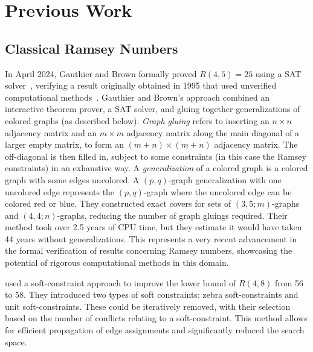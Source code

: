 \section{Previous Work}
\subsection{Classical Ramsey Numbers}

In April 2024, Gauthier and Brown formally proved $R(4, 5) = 25$ using a SAT solver~\cite{r45_formal}, verifying a result originally obtained in 1995 that used unverified computational methods~\cite{r_45_mckay}.
Gauthier and Brown's approach combined an interactive theorem prover, a SAT solver, and gluing together generalizations of colored graphs (as described below).
\emph{Graph gluing} refers to inserting an $n \times n$ adjacency matrix and an $m \times m$ adjacency matrix along the main diagonal of a larger empty matrix, to form an $(m+n) \times (m+n)$ adjacency matrix. 
The off-diagonal is then filled in, subject to some constraints (in this case the Ramsey constraints) in an exhaustive way.
A \emph{generalization} of a colored graph is a colored graph with some edges uncolored. 
A $(p,q)$-graph generalization with one uncolored edge represents the $(p,q)$-graph where the uncolored edge can be colored red or blue.
They constructed exact covers for sets of $(3, 5; m)$-graphs and $(4, 4; n)$-graphs, reducing the number of graph gluings required. 
Their method took over 2.5 years of CPU time, but they estimate it would have taken 44 years without generalizations. This represents a very recent advancement in the formal verification of results concerning Ramsey numbers, showcasing the potential of rigorous computational methods in this domain.

 used a soft-constraint approach to improve the lower bound of $R(4, 8)$ from 56 to 58. 
They introduced two types of soft constraints: zebra soft-constraints and unit soft-constraints. These could be iteratively removed, with their selection based on the number of conflicts relating to a soft-constraint.
This method allows for efficient propagation of edge assignments and significantly reduced the search space.


